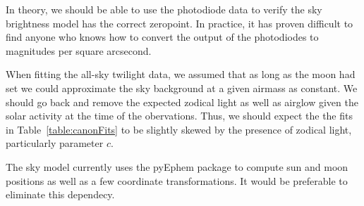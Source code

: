 \documentclass{emulateapj}  %
\begin{document}
In theory, we should be able to use the photodiode data to verify the sky brightness model has the correct zeropoint. In practice, it has proven difficult to find anyone who knows how to convert the output of the photodiodes to magnitudes per square arcsecond.

When fitting the all-sky twilight data, we assumed that as long as the moon had set we could approximate the sky background at a given airmass as constant. We should go back and remove the expected zodical light as well as airglow given the solar activity at the time of the obervations. Thus, we should expect the the fits in Table~\ref{table:canonFits} to be slightly skewed by the presence of zodical light, particularly parameter $c$.  

The sky model currently uses the pyEphem package to compute sun and moon positions as well as a few coordinate transformations. It would be preferable to eliminate this dependecy.  



\end{document}
